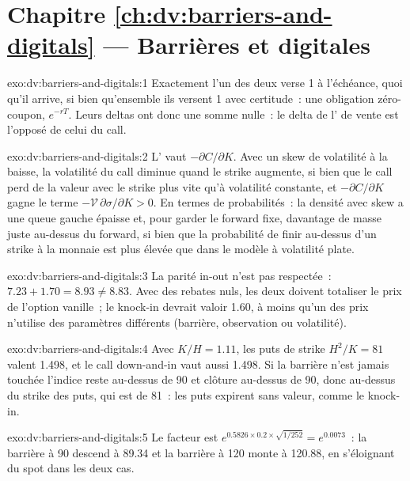 \section*{Chapitre \ref{ch:dv:barriers-and-digitals} --- Barrières et digitales}

\begin{solution}{exo:dv:barriers-and-digitals:1}
Exactement l'un des deux verse 1 à l'échéance, quoi qu'il arrive, si bien qu'ensemble ils versent 1 avec certitude~: une obligation zéro-coupon, $e^{-rT}$.
Leurs deltas ont donc une somme nulle~: le delta de l' de vente est l'opposé de celui du call.
\end{solution}

\begin{solution}{exo:dv:barriers-and-digitals:2}
L' vaut $-\partial C/\partial K$. Avec un skew de volatilité à la baisse, la volatilité du call diminue quand le strike augmente, si bien que le call
perd de la valeur avec le strike plus vite qu'à volatilité constante, et $-\partial C/\partial K$ gagne le terme
$-\mathcal V\,\partial\sigma/\partial K>0$. En termes de probabilités~: la densité avec skew a une queue gauche épaisse et, pour garder
le forward fixe, davantage de masse juste au-dessus du forward, si bien que la probabilité de finir au-dessus d'un strike à la monnaie est plus élevée
que dans le modèle à volatilité plate.
\end{solution}

\begin{solution}{exo:dv:barriers-and-digitals:3}
La parité in-out n'est pas respectée~: $7.23+1.70=8.93\ne8.83$. Avec des rebates nuls, les deux doivent totaliser le prix de l'option vanille~; le knock-in
devrait valoir 1.60, à moins qu'un des prix n'utilise des paramètres différents (barrière, observation ou volatilité).
\end{solution}

\begin{solution}{exo:dv:barriers-and-digitals:4}
Avec $K/H=1.11$, les puts de strike $H^2/K=81$ valent 1.498, et le call down-and-in vaut aussi 1.498. Si la barrière n'est jamais touchée
l'indice reste au-dessus de 90 et clôture au-dessus de 90, donc au-dessus du strike des puts, qui est de 81~: les puts expirent sans valeur, comme le
knock-in.
\end{solution}

\begin{solution}{exo:dv:barriers-and-digitals:5}
Le facteur est $e^{0.5826\times0.2\times\sqrt{1/252}}=e^{0.0073}$~: la barrière à 90 descend à 89.34 et la barrière à 120
monte à 120.88, en s'éloignant du spot dans les deux cas.
\end{solution}


